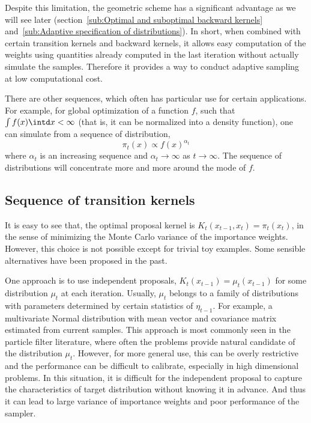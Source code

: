 Despite this limitation, the geometric scheme has a significant advantage as
we will see later (section~\ref{sub:Optimal and suboptimal backward kernels}
and~\ref{sub:Adaptive specification of distributions}). In short, when
combined with certain transition kernels and backward kernels, it allows easy
computation of the weights using quantities already computed in the last
iteration without actually simulate the samples. Therefore it provides a way
to conduct adaptive sampling at low computational cost.

There are other sequences, which often has particular use for certain
applications. For example, for global optimization of a function $f$, such
that $\int f(x)\intd x <\infty$ (that is, it can be normalized into a density
function), one can simulate from a sequence of distribution,
\begin{equation}
  \pi_t(x) \propto f(x)^{\alpha_t}
\end{equation}
where $\alpha_t$ is an increasing sequence and $\alpha_t\to\infty$ as
$t\to\infty$. The sequence of distributions will concentrate more and more
around the mode of $f$.

\subsection{Sequence of transition kernels}
\label{sub:Sequence of transition kernels}

It is easy to see that, the optimal proposal kernel is $K_t(x_{t-1}, x_t) =
\pi_t(x_t)$, in the sense of minimizing the Monte Carlo variance of the
importance weights. However, this choice is not possible except for trivial
toy examples. Some sensible alternatives have been proposed in the past.

One approach is to use independent proposals, $K_t(x_{t-1}) = \mu_t(x_{t-1})$
for some distribution $\mu_t$ at each iteration. Usually, $\mu_t$ belongs to a
family of distributions with parameters determined by certain statistics of
$\eta_{t-1}$. For example, a multivariate Normal distribution with mean vector
and covariance matrix estimated from current samples. This approach is most
commonly seen in the particle filter literature, where often the problems
provide natural candidate of the distribution $\mu_t$. However, for more
general use, this can be overly restrictive and the performance can be
difficult to calibrate, especially in high dimensional problems. In this
situation, it is difficult for the independent proposal to capture the
characteristics of target distribution without knowing it in advance. And thus
it can lead to large variance of importance weights and poor performance of
the sampler.

